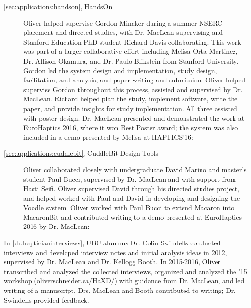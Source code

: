 \begin{description}
\item[\autoref{sec:applications:handson}, HandsOn] Oliver helped supervise Gordon Minaker during a summer NSERC placement and directed studies, with Dr. MacLean supervising and Stanford Education PhD student Richard Davis collaborating.
This work was part of a larger collaborative effort including Melisa Orta Martinez, Dr. Allison Okamura, and Dr. Paulo Blikstein from Stanford University.
Gordon led the system design and implementation, study design, facilitation, and analysis, and paper writing and submission.
Oliver helped supervise Gordon throughout this process, assisted and supervised by Dr. MacLean.
Richard helped plan the study, implement software, write the paper, and provide insights for study implementation.
All three assisted with poster design.
 Dr. MacLean presented and demonstrated the work at EuroHaptics 2016, where it won Best Poster award; the system was also included in a demo presented by Melisa at HAPTICS'16:



\item[\autoref{sec:applications:cuddlebit}, CuddleBit Design Tools] Oliver collaborated closely with undergraduate David Marino and master's student Paul Bucci, supervised by Dr. MacLean and with support from Hasti Seifi.
Oliver supervised David through his directed studies project, and helped worked with Paul and David in developing and designing the Voodle system.
Oliver worked with Paul Bucci to extend Macaron into MacaronBit and contributed writing to a demo presented at EuroHaptics 2016 by Dr. MacLean:


\end{description}

\noindent
In \autoref{ch:hapticianinterviews}, UBC alumnus Dr. Colin Swindells conducted interviews and developed interview notes and initial analysis ideas in 2012, supervised by Dr. MacLean and Dr. Kellogg Booth.
In 2015-2016, Oliver transcribed and analyzed the collected interviews, organized and analyzed the \haxd '15 workshop (\url{oliverschneider.ca/HaXD/}) with guidance from Dr. MacLean, and led writing of a manuscript.
Drs. MacLean and Booth contributed to writing; Dr. Swindells provided feedback.

\nocite{Schneider2015haxdworkshop}

